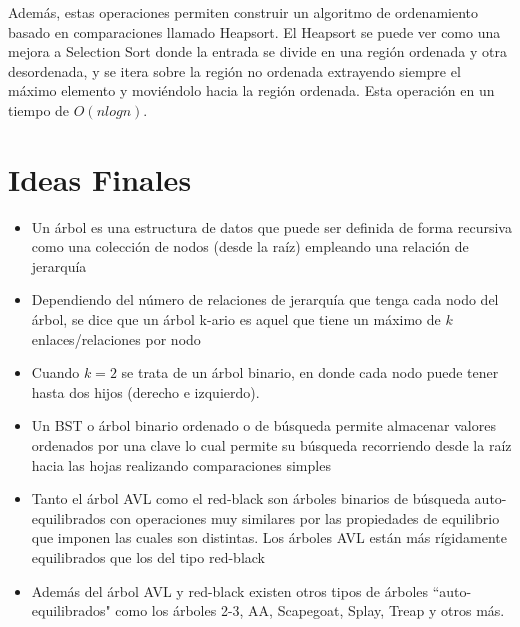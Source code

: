 Además, estas operaciones permiten construir un algoritmo de ordenamiento basado en comparaciones llamado Heapsort. El Heapsort se puede ver como una mejora a Selection Sort donde la entrada se divide en una región ordenada y otra desordenada, y se itera sobre la región no ordenada extrayendo siempre el máximo elemento y moviéndolo hacia la región ordenada. Esta operación en un tiempo de $O(nlogn)$.

\section{Ideas Finales}

\begin{itemize}
\item Un árbol es una estructura de datos que puede ser definida de forma recursiva como una colección de nodos (desde la raíz) empleando una relación de jerarquía
\item Dependiendo del número de relaciones de jerarquía que tenga cada nodo del árbol, se dice que un árbol k-ario es aquel que tiene un máximo de $k$ enlaces/relaciones por nodo
\item Cuando $k=2$ se trata de un árbol binario, en donde cada nodo puede tener hasta dos hijos (derecho e izquierdo).
\item Un BST o árbol binario ordenado o de búsqueda permite almacenar valores ordenados por una clave lo cual permite su búsqueda recorriendo desde la raíz hacia las hojas realizando comparaciones simples
\item Tanto el árbol AVL como el red-black son árboles binarios de búsqueda auto-equilibrados con operaciones muy similares por las propiedades de equilibrio que imponen las cuales son distintas. Los árboles AVL están más rígidamente equilibrados que los del tipo red-black
\item Además del árbol AVL y red-black existen otros tipos de árboles ``auto-equilibrados" como los árboles 2-3, AA, Scapegoat, Splay, Treap y otros más.
\end{itemize}


